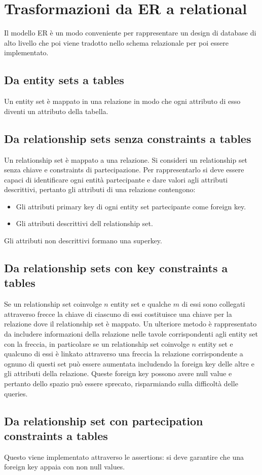 \section{Trasformazioni da ER a relational}
Il modello ER \`e un modo conveniente per rappresentare un design di database di alto livello che poi viene tradotto nello schema relazionale per poi essere implementato.
\subsection{Da entity sets a tables}
Un entity set \`e mappato in una relazione in modo che ogni attributo di esso diventi un attributo della tabella. 
\subsection{Da relationship sets senza constraints a tables}
Un relationship set \`e mappato a una relazione. Si consideri un relationship set senza chiave e constraints di partecipazione. Per rappresentarlo si deve essere capaci di identificare ogni entit\`a partecipante
e dare valori agli attributi descrittivi, pertanto gli attributi di una relazione contengono: 
\begin{itemize}
\item Gli attributi primary key di ogni entity set partecipante come foreign key.
\item Gli attributi descrittivi dell relationship set.
\end{itemize}
Gli attributi non descrittivi formano una superkey.
\subsection{Da relationship sets con key constraints a tables}
Se un relationship set coinvolge $n$ entity set e qualche $m$ di essi sono collegati attraverso frecce la chiave di ciascuno di essi costituisce una chiave per la relazione dove il relationship set \`e mappato. Un 
ulteriore metodo \`e rappresentato da includere informazioni della relazione nelle tavole corrispondenti agli entity set con la freccia, in particolare se un relationship set coinvolge $n$ entity set e qualcuno di 
essi \`e linkato attraverso una freccia la relazione corrispondente a ognuno di questi set pu\`o essere aumentata includendo la foreign key delle altre e gli attributi della relazione. Queste foreign key possono 
avere null value e pertanto dello spazio pu\`o essere sprecato, risparmiando sulla difficolt\`a delle queries. 
\subsection{Da relationship set con partecipation constraints a tables}
Questo viene implementato attraverso le assertions: si deve garantire che una foreign key appaia con non null values. 
